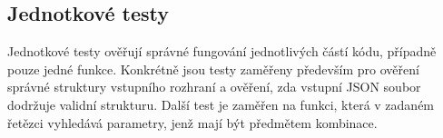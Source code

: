 









\subsection*{Jednotkové testy}
Jednotkové testy ověřují správné fungování jednotlivých částí kódu, případně pouze jedné funkce. Konkrétně jsou testy zaměřeny především pro ověření správné struktury vstupního rozhraní a ověření, zda vstupní JSON soubor dodržuje validní strukturu. Další test je zaměřen na funkci, která v zadaném řetězci vyhledává parametry, jenž mají být předmětem kombinace.





